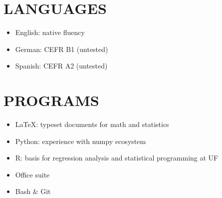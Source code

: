 \documentclass[11pt,letterpaper]{article}
\begin{document}
	\vspace{10pt}
	
	\section{LANGUAGES}
	\begin{itemize}
		\item English: native fluency
		\item German: CEFR B1 (untested)
		\item Spanish: CEFR A2 (untested)
	\end{itemize}
	
	\vspace{10pt}
	
	\section{PROGRAMS}
	\begin{itemize}
		\item LaTeX: typeset documents for math and statistics
		\item Python: experience with numpy ecosystem
		\item R: basis for regression analysis and statistical programming at UF
		\item Office suite
		\item Bash \& Git
	\end{itemize}
	
\end{document}
